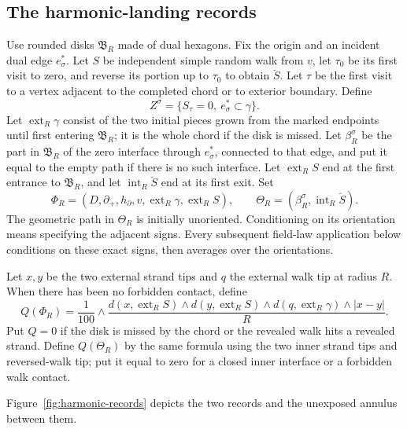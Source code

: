 \subsection{The harmonic-landing records}

Use rounded disks \(\mathfrak B_R\) made of dual hexagons.
Fix the origin and an incident dual edge \(e_\sigma^*\). Let \(S\)
be independent simple random walk from \(v\), let \(\tau_0\) be
its first visit to zero, and reverse its portion up to \(\tau_0\)
to obtain \(\breve S\). Let \(\tau\) be the first visit to a
vertex adjacent to the completed chord or to exterior boundary.
Define
\[
 Z^\sigma=\{S_\tau=0,\ e_\sigma^*\subset\gamma\}.
\]
Let \(\operatorname{ext}_R\gamma\) consist of the two initial
pieces grown from the marked endpoints until first entering
\(\mathfrak B_R\); it is the whole chord if the disk is missed.
Let \(\beta_R^\sigma\) be the part in \(\mathfrak B_R\) of the
zero interface through \(e_\sigma^*\), connected to that edge,
and put it equal to the empty path if there is no such interface.
Let \(\operatorname{ext}_R S\) end at the first entrance to
\(\mathfrak B_R\), and let \(\operatorname{int}_R\breve S\)
end at its first exit. Set
\[
 \Phi_R=(D,\partial_+,h_\partial,v,
              \operatorname{ext}_R\gamma,\operatorname{ext}_R S),
 \qquad
 \Theta_R=(\beta_R^\sigma,\operatorname{int}_R\breve S).
\]
The geometric path in \(\Theta_R\) is initially unoriented.
Conditioning on its orientation means specifying the adjacent signs.
Every subsequent field-law application below conditions on these
exact signs, then averages over the orientations.

Let \(x,y\) be the two external strand tips and \(q\) the external
walk tip at radius \(R\). When there has been no forbidden contact,
define
\[
 Q(\Phi_R)=\frac1{100}\wedge
 \frac{
 d(x,\operatorname{ext}_R S)\wedge
 d(y,\operatorname{ext}_R S)\wedge
 d(q,\operatorname{ext}_R\gamma)\wedge |x-y|}{R}.
\]
Put \(Q=0\) if the disk is missed by the chord or the revealed walk
hits a revealed strand. Define \(Q(\Theta_R)\) by the same formula
using the two inner strand tips and reversed-walk tip; put it equal
to zero for a closed inner interface or a forbidden walk contact.

Figure~\ref{fig:harmonic-records} depicts the two records and the
unexposed annulus between them.

